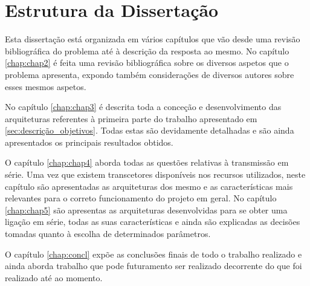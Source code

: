 \section{Estrutura da Dissertação} \label{sec:struct}

Esta dissertação está organizada em vários capítulos que vão desde uma revisão bibliográfica do problema até à descrição da resposta ao mesmo. 
No capítulo \ref{chap:chap2} é feita uma revisão bibliográfica sobre os diversos aspetos que o problema apresenta, expondo também considerações de diversos autores sobre esses mesmos aspetos.  

No capítulo \ref{chap:chap3} é descrita toda a conceção e desenvolvimento das arquiteturas referentes à primeira parte do trabalho apresentado em \ref{sec:descrição_objetivos}. Todas estas são devidamente detalhadas e são ainda apresentados os principais resultados obtidos.

O capítulo \ref{chap:chap4} aborda todas as questões relativas à transmissão em série. Uma vez que existem transcetores disponíveis nos recursos utilizados, neste capítulo são apresentadas as arquiteturas dos mesmo e as características mais relevantes para o correto funcionamento do projeto em geral. No capítulo \ref{chap:chap5} são apresentas as arquiteturas desenvolvidas para se obter uma ligação em série, todas as suas características e ainda são explicadas as decisões tomadas quanto à escolha de determinados parâmetros.

O capítulo \ref{chap:concl} expõe as conclusões finais de todo o trabalho realizado e ainda aborda trabalho que pode futuramento ser realizado decorrente do que foi realizado até ao momento.

